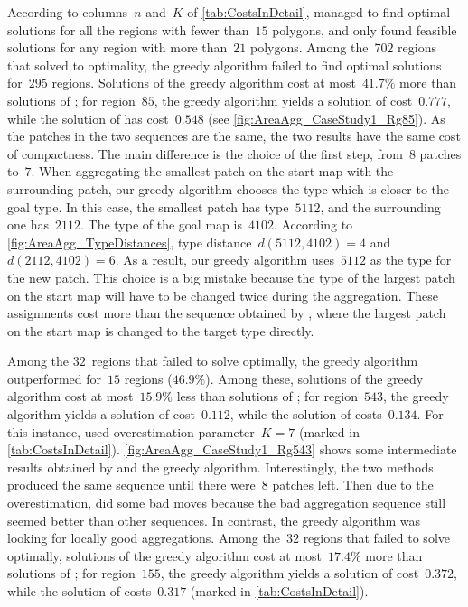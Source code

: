 According to columns~$n$ and~$K$ of \tab\ref{tab:CostsInDetail},
\Astar managed to find optimal solutions 
for all the regions with fewer than~$15$ polygons,
and only found feasible solutions 
for any region with more than~$21$ polygons.
Among the~$702$ regions that \Astar solved to optimality,
the greedy algorithm failed to 
find optimal solutions for~$295$ regions.
Solutions of the greedy algorithm cost
at most~$41.7\%$ more than solutions of \Astar;
for region~$85$, the greedy algorithm yields 
a solution of cost~$0.777$, 
while the solution of \Astar has cost~$0.548$
(see \fig\ref{fig:AreaAgg_CaseStudy1_Rg85}).
As the patches in the two sequences are the same,
the two results have the same cost of compactness.
The main difference is the choice of the first step, 
from~$8$ patches to~$7$.
When aggregating the smallest patch on the start map
with the surrounding patch,
our greedy algorithm chooses the type 
which is closer to the goal type.
In this case, the smallest patch has type~$5112$, and the 
surrounding one has~$2112$.
The type of the goal map is~$4102$.
According to \fig\ref{fig:AreaAgg_TypeDistances},
type distance~$d(5112,4102)=4$ and~$d(2112,4102)=6$.
As a result, our greedy algorithm uses~$5112$ 
as the type for the new patch. 
This choice is a big mistake 
because the type of the largest patch on the start map
will have to be changed twice during the aggregation.
These assignments cost more than the sequence obtained by 
\Astar, where the largest patch on the start map is changed to 
the target type directly.

Among the $32$~regions that 
\Astar failed to solve optimally,
the greedy algorithm outperformed \Astar 
for~$15$ regions ($46.9\%$).
%
Among these, solutions of the greedy algorithm 
cost at most~$15.9\%$ less than solutions of \Astar;
for region~$543$, the greedy algorithm yields 
a solution of cost~$0.112$, 
while the solution of \Astar costs~$0.134$. 
For this instance, \Astar used overestimation parameter~$K=7$
(marked in \tab\ref{tab:CostsInDetail}).
\fig\ref{fig:AreaAgg_CaseStudy1_Rg543} shows 
some intermediate results obtained by
\Astar and the greedy algorithm.
Interestingly, the two methods produced the same sequence until 
there were~$8$ patches left.
Then due to the overestimation, \Astar did some bad moves
because the bad aggregation sequence still seemed better 
than other sequences.
In contrast, the greedy algorithm was looking for locally good 
aggregations.
%
Among the~$32$ regions that \Astar failed to solve optimally,  solutions of the greedy algorithm cost at most~$17.4\%$ 
more than solutions of \Astar; 
for region~$155$, the greedy algorithm yields 
a solution of cost~$0.372$, while
the solution of \Astar costs~$0.317$
(marked in \tab\ref{tab:CostsInDetail}).

